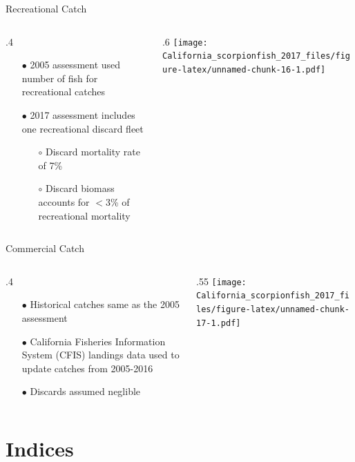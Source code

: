\documentclass[ignorenonframetext,]{beamer}
\def\begincols{\begin{columns}}
\def\begincol{\begin{column}}
\def\endcol{\end{column}}
\def\endcols{\end{columns}}
\begin{document}
\begin{frame}{Recreational Catch}

\begincols
 \begincol{.4\textwidth}

\begin{itemize}
\item[$\bullet$] 2005 assessment used number of fish for recreational catches
\item[$\bullet$] 2017 assessment includes one recreational discard fleet
\begin{itemize}
\item[$\circ$] Discard mortality rate of 7\%
\item[$\circ$] Discard biomass accounts for  $<$3\% of recreational mortality
\end{itemize}
\end{itemize}

\endcol
 \begincol{.6\textwidth}
\texttt{[image: California\_scorpionfish\_2017\_files/figure-latex/unnamed-chunk-16-1.pdf]}\\
\endcol
\endcols

\end{frame}

\begin{frame}{Commercial Catch}

\begincols
 \begincol{.4\textwidth}

\begin{itemize}
  \item[$\bullet$] Historical catches same as the 2005 assessment
  \item[$\bullet$] California Fisheries Information System (CFIS) landings data used to update catches from 2005-2016 
  \item[$\bullet$] Discards assumed neglible
\end{itemize}

\endcol
 \begincol{.55\textwidth}
\texttt{[image: California\_scorpionfish\_2017\_files/figure-latex/unnamed-chunk-17-1.pdf]}
\endcol
\endcols

\end{frame}

\section{Indices}\label{indices}
\end{document}
